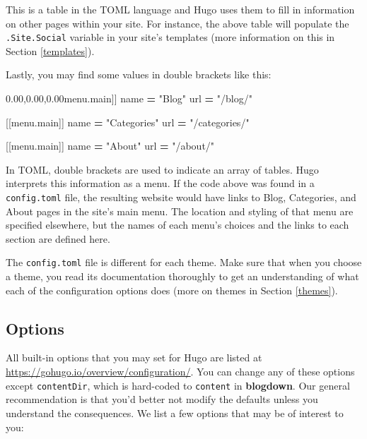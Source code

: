 \documentclass[12pt,]{krantz}
\makeatletter
\newenvironment{Shaded}{\begin{snugshade}}{\end{snugshade}}
\newcommand{\AttributeTok}[1]{\textcolor[rgb]{0.77,0.63,0.00}{#1}}
\newcommand{\NormalTok}[1]{#1}
\newcommand{\OperatorTok}[1]{\textcolor[rgb]{0.81,0.36,0.00}{\textbf{#1}}}
\newcommand{\StringTok}[1]{\textcolor[rgb]{0.31,0.60,0.02}{#1}}
\newcommand{\VariableTok}[1]{\textcolor[rgb]{0.00,0.00,0.00}{#1}}
\newenvironment{kframe}{%
\medskip{}
\setlength{\fboxsep}{.8em}
 \def\at@end@of@kframe{}%
 \ifinner\ifhmode%
  \def\at@end@of@kframe{\end{minipage}}%
  \begin{minipage}{\columnwidth}%
 \fi\fi%
 \def\FrameCommand##1{\hskip\@totalleftmargin \hskip-\fboxsep
 \colorbox{shadecolor}{##1}\hskip-\fboxsep
     \hskip-\linewidth \hskip-\@totalleftmargin \hskip\columnwidth}%
 \MakeFramed {\advance\hsize-\width
   \@totalleftmargin\z@ \linewidth\hsize
   \@setminipage}}%
 {\par\unskip\endMakeFramed%
 \at@end@of@kframe}
\renewenvironment{Shaded}{\begin{kframe}}{\end{kframe}}
\theoremstyle{definition}
\theoremstyle{definition}
\theoremstyle{definition}
\theoremstyle{remark}
\makeatother
\begin{document}
This is a table in the TOML language and Hugo uses them to fill in
information on other pages within your site. For instance, the above
table will populate the \texttt{.Site.Social} variable in your site's
templates (more information on this in Section \ref{templates}).

Lastly, you may find some values in double brackets like this:

\begin{Shaded}
\begin{Highlighting}[]
\NormalTok{[[}\VariableTok{menu}\NormalTok{.}\AttributeTok{main}\NormalTok{]]}
\NormalTok{    name }\OperatorTok{=} \StringTok{"Blog"}
\NormalTok{    url }\OperatorTok{=} \StringTok{"/blog/"}

\NormalTok{[[}\VariableTok{menu}\NormalTok{.}\AttributeTok{main}\NormalTok{]]}
\NormalTok{    name }\OperatorTok{=} \StringTok{"Categories"}
\NormalTok{    url }\OperatorTok{=} \StringTok{"/categories/"}

\NormalTok{[[}\VariableTok{menu}\NormalTok{.}\AttributeTok{main}\NormalTok{]]}
\NormalTok{    name }\OperatorTok{=} \StringTok{"About"}
\NormalTok{    url }\OperatorTok{=} \StringTok{"/about/"}
\end{Highlighting}
\end{Shaded}

In TOML, double brackets are used to indicate an array of tables. Hugo
interprets this information as a menu. If the code above was found in a
\texttt{config.toml} file, the resulting website would have links to
Blog, Categories, and About pages in the site's main menu. The location
and styling of that menu are specified elsewhere, but the names of each
menu's choices and the links to each section are defined here.

The \texttt{config.toml} file is different for each theme. Make sure
that when you choose a theme, you read its documentation thoroughly to
get an understanding of what each of the configuration options does
(more on themes in Section \ref{themes}).

\hypertarget{options}{%
\subsection{Options}\label{options}}

All built-in options that you may set for Hugo are listed
at \url{https://gohugo.io/overview/configuration/}. You can change any
of these options except \texttt{contentDir}, which is hard-coded to
\texttt{content} in \textbf{blogdown}. Our general recommendation is
that you'd better not modify the defaults unless you understand the
consequences. We list a few options that may be of interest to you:
\end{document}
